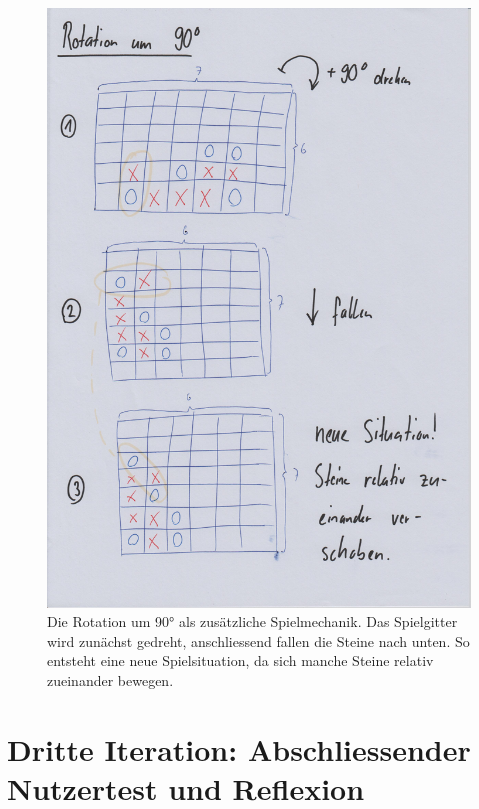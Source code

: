 \documentclass[a4paper,11pt,hidelinks]{scrartcl}
\begin{document}
\begin{figure}
    \centering
    \includegraphics[width=0.7\linewidth]{pics/rotation-papier.jpg}
    \caption{Die Rotation um 90° als zusätzliche Spielmechanik. Das Spielgitter wird zunächst gedreht, anschliessend fallen die Steine nach unten. So entsteht eine neue Spielsituation, da sich manche Steine relativ zueinander bewegen.}
\end{figure}

\section{Dritte Iteration: Abschliessender Nutzertest und Reflexion}
\newpage

\listoffigures
{}
\end{document}
